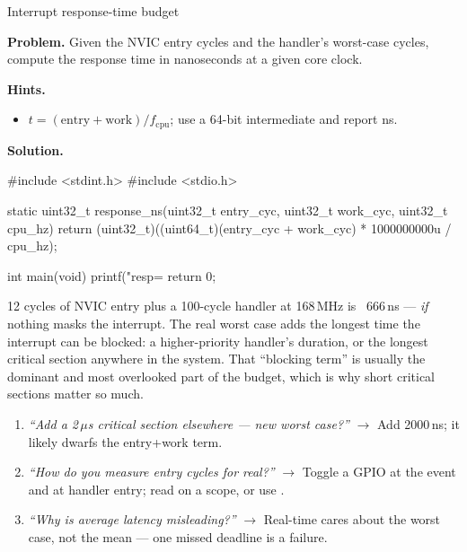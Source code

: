 \begin{gymproblem}{Interrupt response-time budget}

\textbf{Problem.} Given the NVIC entry cycles and the handler's worst-case
cycles, compute the response time in nanoseconds at a given core clock.

\textbf{Hints.}
\begin{itemize}
\item $t = (\text{entry}+\text{work})/f_{\text{cpu}}$; use a 64-bit
  intermediate and report ns.
\end{itemize}

\attempt

\textbf{Solution.}
\begin{cgym}
#include <stdint.h>
#include <stdio.h>

static uint32_t response_ns(uint32_t entry_cyc, uint32_t work_cyc, uint32_t cpu_hz) {
    return (uint32_t)((uint64_t)(entry_cyc + work_cyc) * 1000000000u / cpu_hz);
}

int main(void) {
    printf("resp=%
    return 0;
}
\end{cgym}

12 cycles of NVIC entry plus a 100-cycle handler at 168\,MHz is ~666\,ns ---
\emph{if} nothing masks the interrupt. The real worst case adds the longest time
the interrupt can be blocked: a higher-priority handler's duration, or the
longest critical section anywhere in the system. That ``blocking term'' is
usually the dominant and most overlooked part of the budget, which is why short
critical sections matter so much.

\followups
\begin{enumerate}
\item \emph{``Add a 2\,$\mu$s critical section elsewhere --- new worst case?''}
  $\rightarrow$ Add 2000\,ns; it likely dwarfs the entry+work term.
\item \emph{``How do you measure entry cycles for real?''} $\rightarrow$
  Toggle a GPIO at the event and at handler entry; read on a scope, or use
  .
\item \emph{``Why is average latency misleading?''} $\rightarrow$ Real-time
  cares about the worst case, not the mean --- one missed deadline is a
  failure.
\end{enumerate}
\end{gymproblem}

